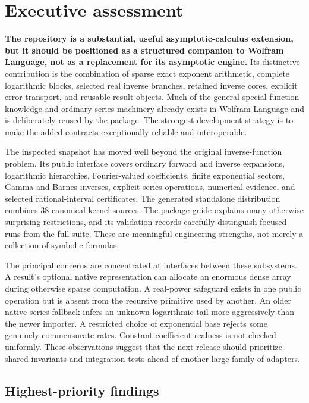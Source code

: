 \section{Executive assessment}

\textbf{The repository is a substantial, useful asymptotic-calculus extension, but it should be positioned as a structured companion to Wolfram Language, not as a replacement for its asymptotic engine.} Its distinctive contribution is the combination of sparse exact exponent arithmetic, complete logarithmic blocks, selected real inverse branches, retained inverse cores, explicit error transport, and reusable result objects. Much of the general special-function knowledge and ordinary series machinery already exists in Wolfram Language and is deliberately reused by the package. The strongest development strategy is to make the added contracts exceptionally reliable and interoperable.\cite{guide,core,native,wl-series,wl-asymptotic,wl-asymptoticsolve}

The inspected snapshot has moved well beyond the original inverse-function problem. Its public interface covers ordinary forward and inverse expansions, logarithmic hierarchies, Fourier-valued coefficients, finite exponential sectors, Gamma and Barnes inverses, explicit series operations, numerical evidence, and selected rational-interval certificates. The generated standalone distribution combines 38 canonical kernel sources. The package guide explains many otherwise surprising restrictions, and its validation records carefully distinguish focused runs from the full suite. These are meaningful engineering strengths, not merely a collection of symbolic formulas.\cite{guide,development,validation}

The principal concerns are concentrated at interfaces between these subsystems. A result's optional native representation can allocate an enormous dense array during otherwise sparse computation. A real-power safeguard exists in one public operation but is absent from the recursive primitive used by another. An older native-series fallback infers an unknown logarithmic tail more aggressively than the newer importer. A restricted choice of exponential base rejects some genuinely commensurate rates. Constant-coefficient realness is not checked uniformly. These observations suggest that the next release should prioritize shared invariants and integration tests ahead of another large family of adapters.\cite{core,operations,flat,native,parameterized}

\subsection{Highest-priority findings}

